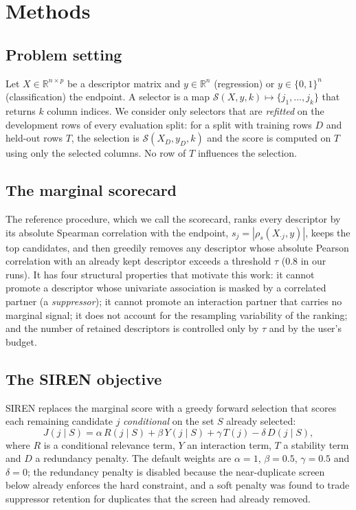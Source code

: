 \section{Methods}

\subsection{Problem setting}

Let $X \in \mathbb{R}^{n \times p}$ be a descriptor matrix and
$y \in \mathbb{R}^{n}$ (regression) or $y \in \{0,1\}^{n}$ (classification) the
endpoint. A selector is a map
$\mathcal{S}(X, y, k) \mapsto \{j_1, \dots, j_k\}$ that returns $k$ column
indices. We consider only selectors that are \emph{refitted} on the development
rows of every evaluation split: for a split with training rows $D$ and held-out
rows $T$, the selection is $\mathcal{S}(X_D, y_D, k)$ and the score is computed
on $T$ using only the selected columns. No row of $T$ influences the selection.

\subsection{The marginal scorecard}

The reference procedure, which we call the scorecard, ranks every descriptor by
its absolute Spearman correlation with the endpoint,
$s_j = |\rho_s(X_{\cdot j}, y)|$, keeps the top candidates, and then greedily
removes any descriptor whose absolute Pearson correlation with an already kept
descriptor exceeds a threshold $\tau$ (0.8 in our runs). It has four structural
properties that motivate this work: it cannot promote a descriptor whose
univariate association is masked by a correlated partner (a \emph{suppressor});
it cannot promote an interaction partner that carries no marginal signal; it
does not account for the resampling variability of the ranking; and the number
of retained descriptors is controlled only by $\tau$ and by the user's budget.

\subsection{The SIREN objective}

SIREN replaces the marginal score with a greedy forward selection that scores
each remaining candidate $j$ \emph{conditional} on the set $S$ already selected:
\begin{equation}
J(j \mid S) = \alpha\, R(j \mid S) + \beta\, Y(j \mid S)
            + \gamma\, T(j) - \delta\, D(j \mid S),
\end{equation}
where $R$ is a conditional relevance term, $Y$ an interaction term, $T$ a
stability term and $D$ a redundancy penalty. The default weights are
$\alpha = 1$, $\beta = 0.5$, $\gamma = 0.5$ and $\delta = 0$; the redundancy
penalty is disabled because the near-duplicate screen below already enforces the
hard constraint, and a soft penalty was found to trade suppressor retention for
duplicates that the screen had already removed.

